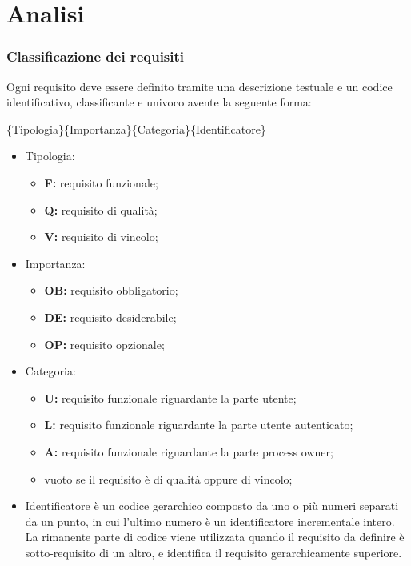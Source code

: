 \section{Analisi}
\subsubsection{Classificazione dei requisiti}
Ogni requisito deve essere definito tramite  una descrizione testuale e un codice identificativo, classificante e univoco avente la seguente forma:

\begin{center}\{Tipologia\}\{Importanza\}\{Categoria\}\{Identificatore\}\end{center}


\begin{itemize}

\item Tipologia:
\begin{itemize}
\item \textbf{F:} requisito funzionale;
\item \textbf{Q:} requisito di qualità;
\item \textbf{V:} requisito di vincolo;
\end{itemize}

\item Importanza:
\begin{itemize}
\item \textbf{OB:} requisito obbligatorio;
\item \textbf{DE:} requisito desiderabile;
\item \textbf{OP:} requisito opzionale;
\end{itemize}


\item Categoria:
\begin{itemize}
\item \textbf{U:} requisito funzionale riguardante la parte utente;
\item \textbf{L:} requisito funzionale riguardante la parte utente autenticato;
\item \textbf{A:} requisito funzionale riguardante la parte process owner;
\item vuoto se il requisito è di qualità oppure di vincolo;
\end{itemize}


\item Identificatore è un codice gerarchico composto da uno o più numeri separati da un punto, in cui l'ultimo numero è un identificatore incrementale intero.\\
La rimanente parte di codice viene utilizzata quando il requisito da definire è sotto-requisito di un altro, e identifica il requisito gerarchicamente superiore.

\end{itemize}


